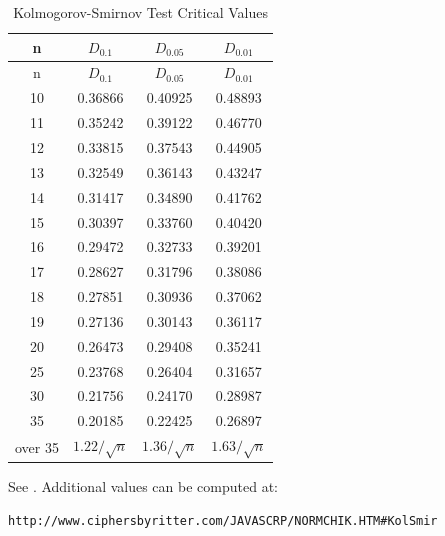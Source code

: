 \documentclass[
]{book}
\theoremstyle{definition}
\theoremstyle{definition}
\theoremstyle{definition}
\theoremstyle{definition}
\theoremstyle{remark}
\begin{document}
\hypertarget{tab:ksValues}{}
\begin{longtable}[]{@{}cccc@{}}
\caption{\label{tab:ksValues} Kolmogorov-Smirnov Test Critical Values}\tabularnewline
\toprule
n & \(D_{0.1}\) & \(D_{0.05}\) & \(D_{0.01}\) \\
\midrule
\endfirsthead
\toprule
n & \(D_{0.1}\) & \(D_{0.05}\) & \(D_{0.01}\) \\
\midrule
\endhead
10 & 0.36866 & 0.40925 & 0.48893 \\
11 & 0.35242 & 0.39122 & 0.46770 \\
12 & 0.33815 & 0.37543 & 0.44905 \\
13 & 0.32549 & 0.36143 & 0.43247 \\
14 & 0.31417 & 0.34890 & 0.41762 \\
15 & 0.30397 & 0.33760 & 0.40420 \\
16 & 0.29472 & 0.32733 & 0.39201 \\
17 & 0.28627 & 0.31796 & 0.38086 \\
18 & 0.27851 & 0.30936 & 0.37062 \\
19 & 0.27136 & 0.30143 & 0.36117 \\
20 & 0.26473 & 0.29408 & 0.35241 \\
25 & 0.23768 & 0.26404 & 0.31657 \\
30 & 0.21756 & 0.24170 & 0.28987 \\
35 & 0.20185 & 0.22425 & 0.26897 \\
over 35 & \(1.22/\sqrt{n}\) & \(1.36/\sqrt{n}\) & \(1.63/\sqrt{n}\) \\
\bottomrule
\end{longtable}

\hfill\break
See \citep{Miller1956aa}. Additional values can be computed at:\\

\begin{verbatim}
http://www.ciphersbyritter.com/JAVASCRP/NORMCHIK.HTM#KolSmir
\end{verbatim}

  

\printindex
\end{document}

